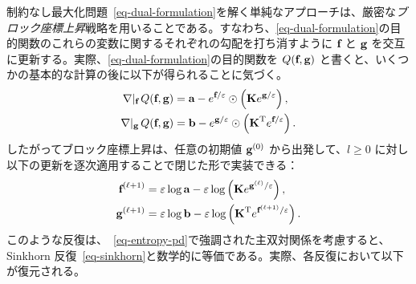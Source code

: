 \begin{rem}\label{rem-sinkh-block}
制約なし最大化問題~\eqref{eq-dual-formulation}を解く単純なアプローチは、厳密な\emph{ブロック座標上昇}戦略を用いることである。すなわち、\eqref{eq-dual-formulation}の目的関数のこれらの変数に関するそれぞれの勾配を打ち消すように $\mathrm{\textbf{f}}$ と $\mathrm{\textbf{g}}$ を交互に更新する。実際、\eqref{eq-dual-formulation}の目的関数を $Q(\mathrm{\textbf{f}},\mathrm{\textbf{g}})$ と書くと、いくつかの基本的な計算の後に以下が得られることに気づく。
\begin{align}
	\label{eq-dualupadate-sinkh-1}\nabla|_{\mathrm{\textbf{f}}}\, Q(\mathrm{\textbf{f}},\mathrm{\textbf{g}}) &=  \mathrm{\textbf{a}} - e^{\mathrm{\textbf{f}}/\varepsilon}\odot \left(\mathrm{\textbf{K}} e^{\mathrm{\textbf{g}}/\varepsilon}\right),\\
	\label{eq-dualupadate-sinkh-2}\nabla|_{\mathrm{\textbf{g}}}\, Q(\mathrm{\textbf{f}},\mathrm{\textbf{g}}) &=  \mathrm{\textbf{b}} - e^{\mathrm{\textbf{g}}/\varepsilon}\odot \left({\mathrm{\textbf{K}}}^{\mathrm{T}} e^{\mathrm{\textbf{f}}/\varepsilon}\right).
\end{align}
したがってブロック座標上昇は、任意の初期値 $\mathrm{\textbf{g}}^{(0)}$ から出発して、$l\geq 0$ に対し以下の更新を逐次適用することで閉じた形で実装できる：
\begin{align}
	\label{eq-slse-sinkh-1}\mathrm{\textbf{f}}^{(\ell+1)} &= \varepsilon \log \mathrm{\textbf{a}} -\varepsilon\log\left(\mathrm{\textbf{K}} e^{\mathrm{\textbf{g}}^{(\ell)}/\varepsilon}\right), \\
	\label{eq-slse-sinkh-2}\mathrm{\textbf{g}}^{(\ell+1)} &= \varepsilon \log \mathrm{\textbf{b}}- \varepsilon\log\left({\mathrm{\textbf{K}}}^{\mathrm{T}} e^{\mathrm{\textbf{f}}^{(\ell+1)}/\varepsilon}\right).
\end{align}
このような反復は、~\eqref{eq-entropy-pd}で強調された主双対関係を考慮すると、Sinkhorn 反復~\eqref{eq-sinkhorn}と数学的に等価である。実際、各反復において以下が復元される。
\end{rem}

